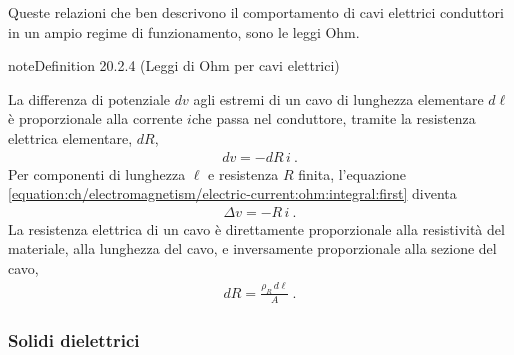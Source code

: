 \documentclass[letterpaper,10pt,italian]{jupyterBook}
\begin{document}
\sphinxAtStartPar
Queste relazioni che ben descrivono il comportamento di cavi elettrici conduttori in un ampio regime di funzionamento, sono le leggi Ohm.
\label{ch/electromagnetism/electric-current:definition-3}
\begin{sphinxadmonition}{note}{Definition 20.2.4 (Leggi di Ohm per cavi elettrici)}



\sphinxAtStartPar
{} La differenza di potenziale \(dv\) agli estremi di un cavo di lunghezza elementare \(d \ell\) è proporzionale alla corrente \(i\)che passa nel conduttore, tramite la resistenza elettrica elementare, \(d R\),
\begin{equation}\label{equation:ch/electromagnetism/electric-current:ohm:integral:first}
\begin{split}dv = - dR \, i \ .\end{split}
\end{equation}
\sphinxAtStartPar
Per componenti di lunghezza \(\ell\) e resistenza \(R\) finita, l’equazione \eqref{equation:ch/electromagnetism/electric-current:ohm:integral:first} diventa
\begin{equation}\label{equation:ch/electromagnetism/electric-current:ohm:integral:first:R}
\begin{split}\Delta v = - R \, i \ .\end{split}
\end{equation}
\sphinxAtStartPar
{} La resistenza elettrica di un cavo è direttamente proporzionale alla resistività del materiale, alla lunghezza del cavo, e inversamente proporzionale alla sezione del cavo,
\begin{equation}\label{equation:ch/electromagnetism/electric-current:ohm:integral:second}
\begin{split}dR = \frac{\rho_R \, d\ell}{A} \ .\end{split}
\end{equation}\end{sphinxadmonition}


\subsubsection{Solidi dielettrici}
\label{\detokenize{ch/electromagnetism/electric-current:solidi-dielettrici}}\label{\detokenize{ch/electromagnetism/electric-current:physics-hs-electromagnetism-electric-current-solids-dielectric}}
\sphinxAtStartPar
{}
\end{document}
